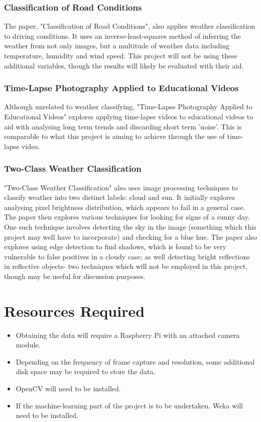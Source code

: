 \documentclass[12pt]{article}
\begin{document}
\subsubsection*{Classification of Road Conditions}

The paper, "Classification of Road Conditions"\cite{classroad}, also applies weather classification to driving conditions. It uses an inverse-least-squares method of inferring the weather from not only images, but a multitude of weather data including temperature, humidity and wind speed. This project will not be using these additional variables, though the results will likely be evaluated with their aid.

\subsubsection*{Time-Lapse Photography Applied to Educational Videos}

Although unrelated to weather classifying, "Time-Lapse Photography Applied to Educational Videos"\cite{educational} explores applying time-lapse videos to educational videos to aid with analysing long term trends and discarding short term 'noise'. This is comparable to what this project is aiming to achieve through the use of time-lapse video.

\subsubsection*{Two-Class Weather Classification}

"Two-Class Weather Classification"\cite{twoclass} also uses image processing techniques to classify weather into two distinct labels: cloud and sun. It initially explores analysing pixel brightness distribution, which appears to fail in a general case. The paper then explores various techniques for looking for signs of a sunny day. One such technique involves detecting the sky in the image (something which this project may well have to incorporate) and checking for a blue hue. The paper also explores using edge detection to find shadows, which is found to be very vulnerable to false positives in a cloudy case; as well detecting bright reflections in reflective objects- two techniques which will not be employed in this project, though may be useful for discussion purposes.

\section*{Resources Required}
\begin{itemize}
	\item Obtaining the data will require a Raspberry Pi\cite{rpi} with an attached camera module.
	\item Depending on the frequency of frame capture and resolution, some additional disk space may be required to store the data.
	\item OpenCV\cite{ocv} will need to be installed.
	\item If the machine-learning part of the project is to be undertaken, Weka\cite{weka} will need to be installed.
\end{itemize}
\end{document}
